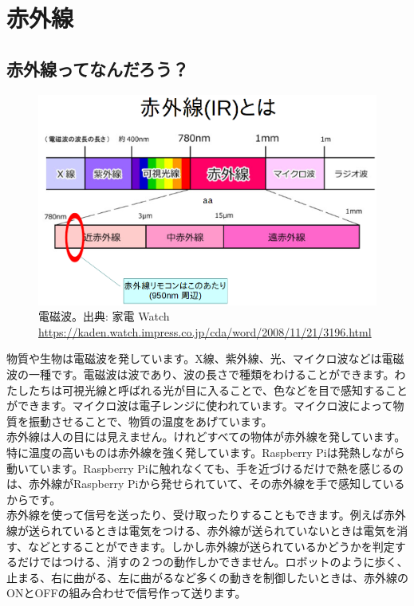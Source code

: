 \section{赤外線}
\subsection{赤外線ってなんだろう？}

\begin{figure}[H]
\centering
\includegraphics[scale=0.5]{images/chap05/text05-img036.png}
\caption{電磁波。出典: 家電 Watch \url{https://kaden.watch.impress.co.jp/cda/word/2008/11/21/3196.html} }

\end{figure}

物質や生物は電磁波を発しています。X線、紫外線、光、マイクロ波などは電磁波の一種です。電磁波は波であり、波の長さで種類をわけることができます。わたしたちは可視光線と呼ばれる光が目に入ることで、色などを目で感知することができます。マイクロ波は電子レンジに使われています。マイクロ波によって物質を振動させることで、物質の温度をあげています。\\

赤外線は人の目には見えません。けれどすべての物体が赤外線を発しています。特に温度の高いものは赤外線を強く発しています。Raspberry Piは発熱しながら動いています。Raspberry Piに触れなくても、手を近づけるだけで熱を感じるのは、赤外線がRaspberry Piから発せられていて、その赤外線を手で感知しているからです。\\

赤外線を使って信号を送ったり、受け取ったりすることもできます。例えば赤外線が送られているときは電気をつける、赤外線が送られていないときは電気を消す、などとすることができます。しかし赤外線が送られているかどうかを判定するだけではつける、消すの２つの動作しかできません。ロボットのように歩く、止まる、右に曲がる、左に曲がるなど多くの動きを制御したいときは、赤外線のONとOFFの組み合わせで信号作って送ります。

